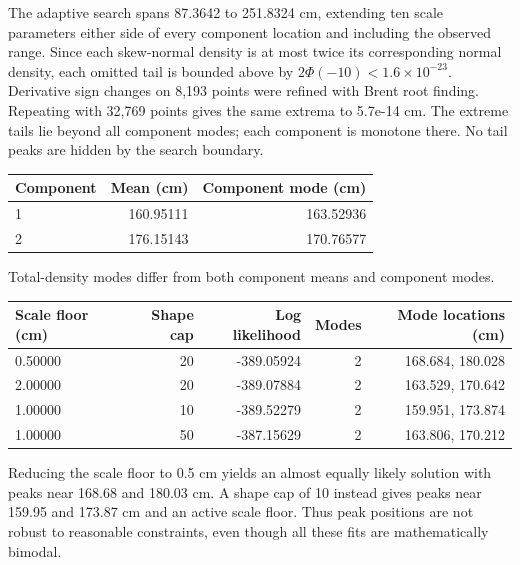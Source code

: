 \documentclass[11pt,a4paper]{article}
\begin{document}
The adaptive search spans 87.3642 to 251.8324 cm, extending ten scale parameters either side of every component location and including the observed range. Since each skew-normal density is at most twice its corresponding normal density, each omitted tail is bounded above by $2\Phi(-10)<1.6\times10^{-23}$. Derivative sign changes on 8,193 points were refined with Brent root finding. Repeating with 32,769 points gives the same extrema to 5.7e-14 cm. The extreme tails lie beyond all component modes; each component is monotone there. No tail peaks are hidden by the search boundary.

\begin{center}
\small
\begin{tabular}{lrr}
\toprule
Component & Mean (cm) & Component mode (cm)\\
\midrule
1 & 160.95111 & 163.52936\\
2 & 176.15143 & 170.76577\\
\bottomrule
\end{tabular}
\end{center}
Total-density modes differ from both component means and component modes.

\begin{center}
\small
\begin{tabular}{lrrrr}
\toprule
Scale floor (cm) & Shape cap & Log likelihood & Modes & Mode locations (cm)\\
\midrule
0.50000 & 20 & -389.05924 & 2 & 168.684, 180.028\\
2.00000 & 20 & -389.07884 & 2 & 163.529, 170.642\\
1.00000 & 10 & -389.52279 & 2 & 159.951, 173.874\\
1.00000 & 50 & -387.15629 & 2 & 163.806, 170.212\\
\bottomrule
\end{tabular}
\end{center}
Reducing the scale floor to 0.5 cm yields an almost equally likely solution with peaks near 168.68 and 180.03 cm. A shape cap of 10 instead gives peaks near 159.95 and 173.87 cm and an active scale floor. Thus peak positions are not robust to reasonable constraints, even though all these fits are mathematically bimodal.
\end{document}
